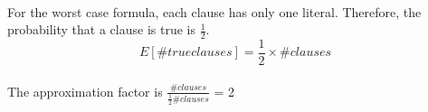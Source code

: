 \begin{problem}{2} ~\\
For the worst case formula, each clause has only one literal. Therefore, the probability that a clause is true is $\frac{1}{2}$. $$E[\# true clauses] = \frac{1}{2} \times \# clauses$$\\
The approximation factor is $\frac{\# clauses}{\frac{1}{2}\# clauses}$ = 2
\end{problem}